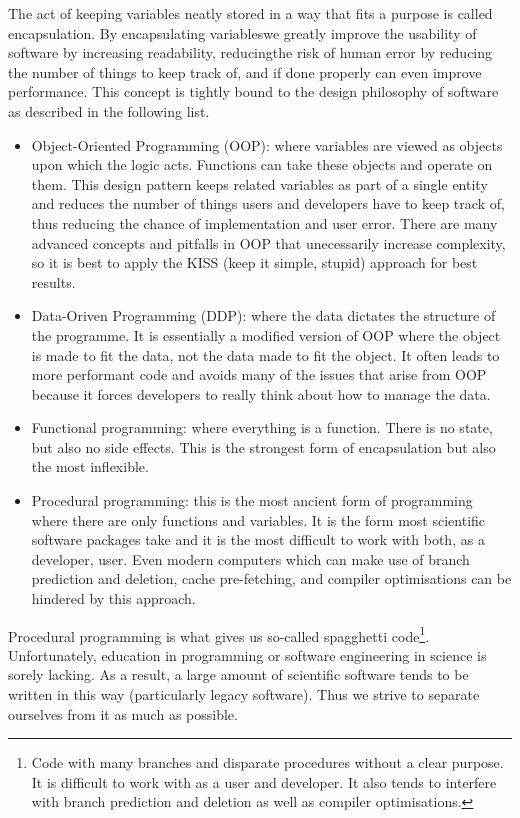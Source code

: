 The act of keeping variables neatly stored in a way that fits a purpose is called encapsulation. By encapsulating variableswe greatly improve the usability of software by increasing readability, reducingthe risk of human error by reducing the number of things to keep track of, and if done properly can even improve performance. This concept is tightly bound to the design philosophy of software as described in the following list.
\begin{itemize}
    \item Object-Oriented Programming (OOP): where variables are viewed as objects upon which the logic acts. Functions can take these objects and operate on them. This design pattern keeps related variables as part of a single entity and reduces the number of things users and developers have to keep track of, thus reducing the chance of implementation and user error. There are many advanced concepts and pitfalls in OOP that unecessarily increase complexity, so it is best to apply the KISS (keep it simple, stupid) approach for best results.
    \item Data-Oriven Programming (DDP): where the data dictates the structure of the programme. It is essentially a modified version of OOP where the object is made to fit the data, not the data made to fit the object. It often leads to more performant code and avoids many of the issues that arise from OOP because it forces developers to really think about how to manage the data.
    \item Functional programming: where everything is a function. There is no state, but also no side effects. This is the strongest form of encapsulation but also the most inflexible.
    \item Procedural programming: this is the most ancient form of programming where there are only functions and variables. It is the form most scientific software packages take and it is the most difficult to work with both, as a developer, user. Even modern computers which can make use of branch prediction and deletion, cache pre-fetching, and compiler optimisations can be hindered by this approach.
\end{itemize}

Procedural programming is what gives us so-called spagghetti code\footnote{Code with many branches and disparate procedures without a clear purpose. It is difficult to work with as a user and developer. It also tends to interfere with branch prediction and deletion as well as compiler optimisations.}. Unfortunately, education in programming or software engineering in science is sorely lacking. As a result, a large amount of scientific software tends to be written in this way (particularly legacy software). Thus we strive to separate ourselves from it as much as possible.


